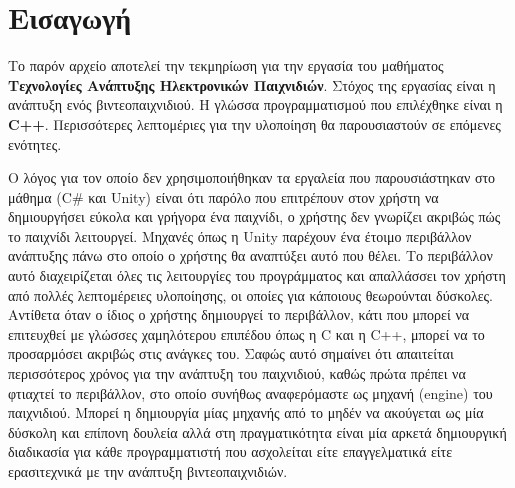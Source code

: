 \documentclass[12pt]{article}
\begin{document}
\begin{titlepage}
		
		
		
		
		
		\vfill %
		
	\end{titlepage}
	
	
	
	\tableofcontents
	
	\newpage

	\section{Εισαγωγή}

	Το παρόν αρχείο αποτελεί την τεκμηρίωση για την εργασία του μαθήματος \textbf{Τεχνολογίες Ανάπτυξης Ηλεκτρονικών Παιχνιδιών}. Στόχος της εργασίας είναι η ανάπτυξη ενός βιντεοπαιχνιδιού. Η γλώσσα προγραμματισμού που επιλέχθηκε είναι η \textbf{C++}. Περισσότερες λεπτομέριες για την υλοποίηση θα παρουσιαστούν σε επόμενες ενότητες.
	
	Ο λόγος για τον οποίο δεν χρησιμοποιήθηκαν τα εργαλεία που παρουσιάστηκαν στο μάθημα (C\# και Unity) είναι ότι παρόλο που επιτρέπουν στον χρήστη να δημιουργήσει εύκολα και γρήγορα ένα παιχνίδι, ο χρήστης δεν γνωρίζει ακριβώς πώς το παιχνίδι λειτουργεί. Μηχανές όπως η Unity παρέχουν ένα έτοιμο περιβάλλον ανάπτυξης πάνω στο οποίο ο χρήστης θα αναπτύξει αυτό που θέλει. Το περιβάλλον αυτό διαχειρίζεται όλες τις λειτουργίες του προγράμματος και απαλλάσσει τον χρήστη από πολλές λεπτομέρειες υλοποίησης, οι οποίες για κάποιους θεωρούνται δύσκολες. Αντίθετα όταν ο ίδιος ο χρήστης δημιουργεί το περιβάλλον, κάτι που μπορεί να επιτευχθεί με γλώσσες χαμηλότερου επιπέδου όπως η C και η C++, μπορεί να το προσαρμόσει ακριβώς στις ανάγκες του. Σαφώς αυτό σημαίνει ότι απαιτείται περισσότερος χρόνος για την ανάπτυξη του παιχνιδιού, καθώς πρώτα πρέπει να φτιαχτεί το περιβάλλον, στο οποίο συνήθως αναφερόμαστε ως μηχανή (engine) του παιχνιδιού. Μπορεί η δημιουργία μίας μηχανής από το μηδέν να ακούγεται ως μία δύσκολη και επίπονη δουλεία αλλά στη πραγματικότητα είναι μία αρκετά δημιουργική διαδικασία για κάθε προγραμματιστή που ασχολείται είτε επαγγελματικά είτε ερασιτεχνικά με την ανάπτυξη βιντεοπαιχνιδιών.
	
\end{document}
